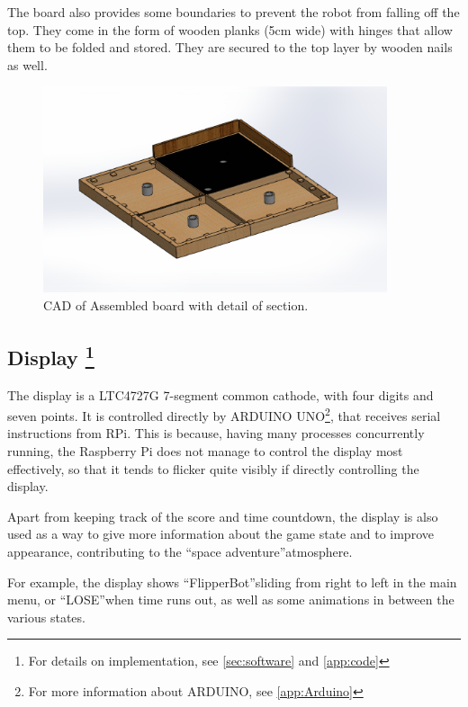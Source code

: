 \documentclass[a4paper,twoside]{book}
\begin{document}
The board also provides some boundaries to prevent the robot from falling off the top. They come in the form of wooden planks (5cm wide) with hinges that allow them to be folded and stored. They are secured to the top layer by wooden nails as well.

\begin{figure}[h]
\centering
\includegraphics[width=0.9\textwidth]{img/Board.eps}
\caption{CAD of Assembled board with detail of section.}
\end{figure}

\subsection[Display]{Display \footnote{For details on implementation, see \autoref{sec:software} and \autoref{app:code}}}

The display is a LTC4727G 7-segment common cathode, with four digits and seven points. It is controlled directly by ARDUINO UNO\footnote{For more information about ARDUINO, see \autoref{app:Arduino}}, that receives serial instructions from RPi. This is because, having many processes concurrently running, the Raspberry Pi does not manage to control the display most effectively, so that it tends to flicker quite visibly if directly controlling the display.

Apart from keeping track of the score and time countdown, the display is also used as a way to give more information about the game state and to improve appearance, contributing to the \textquotedblleft space adventure\textquotedblright  atmosphere.

For example, the display shows \textquotedblleft FlipperBot\textquotedblright  sliding from right to left in the main menu, or \textquotedblleft LOSE\textquotedblright  when time runs out, as well as some animations in between the various states.
\end{document}
